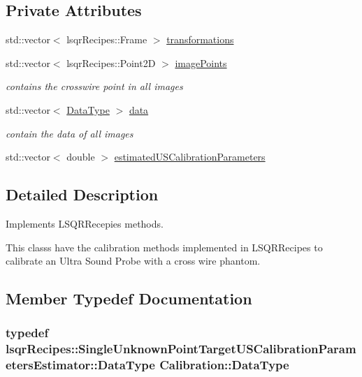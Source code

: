 \subsection*{Private Attributes}
\begin{DoxyCompactItemize}
\item 
std\-::vector$<$ lsqr\-Recipes\-::\-Frame $>$ \hyperlink{class_calibration_a017d6eeb363f25b9405c34dc9f8f3964}{transformations}
\item 
std\-::vector$<$ lsqr\-Recipes\-::\-Point2\-D $>$ \hyperlink{class_calibration_a47ea86d69e758e27787531ff5cca8cc0}{image\-Points}
\begin{DoxyCompactList}\small\item\em contains the crosswire point in all images \end{DoxyCompactList}\item 
std\-::vector$<$ \hyperlink{class_calibration_af52a8932eb28acdb8d9c35fb863145d6}{Data\-Type} $>$ \hyperlink{class_calibration_ae60f27f8e8f6163ea55d1b8b70f96820}{data}
\begin{DoxyCompactList}\small\item\em contain the data of all images \end{DoxyCompactList}\item 
std\-::vector$<$ double $>$ \hyperlink{class_calibration_ac6eb35a52a7c44b079af5e533be6b48b}{estimated\-U\-S\-Calibration\-Parameters}
\end{DoxyCompactItemize}


\subsection{Detailed Description}
Implements L\-S\-Q\-R\-Recepies methods. 

This classs have the calibration methods implemented in L\-S\-Q\-R\-Recipes to calibrate an Ultra Sound Probe with a cross wire phantom. 

\subsection{Member Typedef Documentation}
\hypertarget{class_calibration_af52a8932eb28acdb8d9c35fb863145d6}{
\subsubsection[{Data\-Type}]{\setlength{\rightskip}{0pt plus 5cm}typedef lsqr\-Recipes\-::\-Single\-Unknown\-Point\-Target\-U\-S\-Calibration\-Parameters\-Estimator\-::\-Data\-Type {\bf Calibration\-::\-Data\-Type}}}\label{d2/d40/class_calibration_af52a8932eb28acdb8d9c35fb863145d6}


